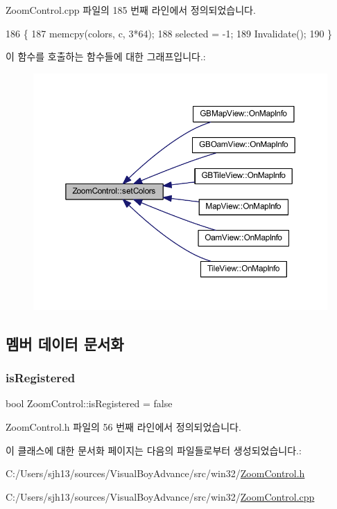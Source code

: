 Zoom\+Control.\+cpp 파일의 185 번째 라인에서 정의되었습니다.


\begin{DoxyCode}
186 \{
187   memcpy(colors, c, 3*64);
188   selected = -1;
189   Invalidate();
190 \}
\end{DoxyCode}
이 함수를 호출하는 함수들에 대한 그래프입니다.\+:
\nopagebreak
\begin{figure}[H]
\begin{center}
\leavevmode
\includegraphics[width=350pt]{class_zoom_control_a97501cc16d3068eefa1b5d9d23e9d0d9_icgraph}
\end{center}
\end{figure}


\subsection{멤버 데이터 문서화}
\mbox{\label{class_zoom_control_a545871645485be870723f47d8ef439ff}} 
\subsubsection{\texorpdfstring{is\+Registered}{isRegistered}}
{\footnotesize\ttfamily bool Zoom\+Control\+::is\+Registered = false\hspace{0.3cm}{\ttfamily [static]}}



Zoom\+Control.\+h 파일의 56 번째 라인에서 정의되었습니다.



이 클래스에 대한 문서화 페이지는 다음의 파일들로부터 생성되었습니다.\+:\begin{DoxyCompactItemize}
\item 
C\+:/\+Users/sjh13/sources/\+Visual\+Boy\+Advance/src/win32/\mbox{\hyperlink{_zoom_control_8h}{Zoom\+Control.\+h}}\item 
C\+:/\+Users/sjh13/sources/\+Visual\+Boy\+Advance/src/win32/\mbox{\hyperlink{_zoom_control_8cpp}{Zoom\+Control.\+cpp}}\end{DoxyCompactItemize}
